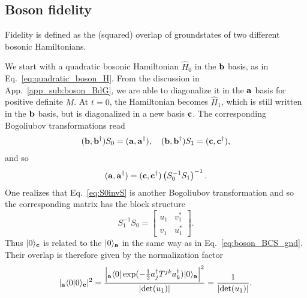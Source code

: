 \subsection{Boson fidelity} 
\label{app_sub:boson_fidelity}

Fidelity is defined as the (squared) overlap of groundstates of two different bosonic Hamiltonians. 

We start with a quadratic bosonic Hamiltonian $\hat{H}_0$ in the ${\bf b}$ basis, as in Eq.~\eqref{eq:quadratic_boson_H}. From the discussion in App.~\ref{app_sub:boson_BdG}, we are able to diagonalize it in the ${\bf a}$ basis for positive definite $M$. At $t=0$, the Hamiltonian becomes $\hat{H}_1$, which is still written in the ${\bf b}$ basis, but is diagonalized in a new basis ${\bf c}$. The corresponding Bogoliubov transformations read
\begin{equation}\begin{aligned}
\label{eq:two_BdG}
({\bf b} , {\bf b}^\dagger)S_0=({\bf a} , {\bf a}^\dagger),\quad
({\bf b} , {\bf b}^\dagger)S_1=({\bf c} , {\bf c}^\dagger),
\end{aligned}\end{equation}
and so
\begin{equation}\begin{aligned}
\label{eq:S0invS}
({\bf a} , {\bf a}^\dagger)=({\bf c} , {\bf c}^\dagger)\left(S_0^{-1}S_1\right)^{-1}.
\end{aligned}\end{equation}
One realizes that Eq.~\eqref{eq:S0invS} is another Bogoliubov transformation and so the corresponding matrix has the block structure
\begin{equation}
S_1^{-1}S_0=\begin{bmatrix}
u_1 & v_1^*\\
v_1 & u_1^*
\end{bmatrix}.
\end{equation}
Thus $|0\rangle_{\bf c}$ is related to the $|0\rangle_{{\bf a}}$ in the same way as in Eq.~\eqref{eq:boson_BCS_gnd}. Their overlap is therefore given by the normalization factor
\begin{equation}\begin{aligned}
|{}_{\bf a}\langle0|0\rangle_{\bf c}|^2=\frac{\Big|{}_{\bf a}\langle 0 | \exp( -\frac{1}{2} a_j^{\dagger} T^{jk} a_k^{\dagger} )|0   \rangle_{\bf a} \Big|^2}{|\text{det}(u_1)|} = \frac{1}{|\text{det}(u_1)|}.
\end{aligned}\end{equation}


